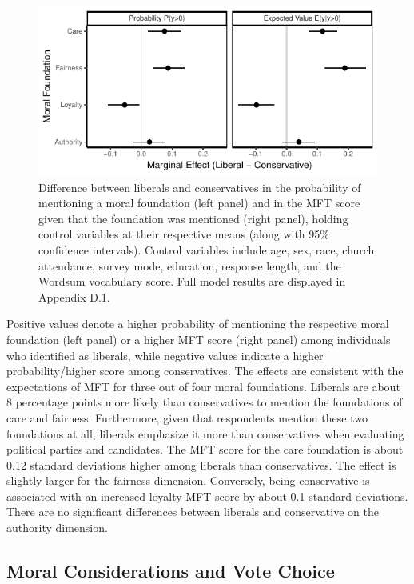 \documentclass[12pt]{article}
\begin{document}
\begin{figure}[ht]\centering
\includegraphics{../calc/fig/tobit_ideol.pdf}
\caption{Difference between liberals and conservatives in the probability of mentioning a moral foundation (left panel) and in the MFT score given that the foundation was mentioned (right panel), holding control variables at their respective means (along with 95\% confidence intervals). Control variables include age, sex, race, church attendance, survey mode, education, response length, and the Wordsum vocabulary score. Full model results are displayed in Appendix D.1.
}\label{fig:tobit_ideol}
\end{figure}

Positive values denote a higher probability of mentioning the respective moral foundation (left panel) or a higher MFT score (right panel) among individuals who identified as liberals, while negative values indicate a higher probability/higher score among conservatives. The effects are consistent with the expectations of MFT for three out of four moral foundations. Liberals are about 8 percentage points more likely than conservatives to mention the foundations of care and fairness. Furthermore, given that respondents mention these two foundations at all, liberals emphasize it more than conservatives when evaluating political parties and candidates. The MFT score for the care foundation is about 0.12 standard deviations higher among liberals than conservatives. The effect is slightly larger for the fairness dimension. Conversely, being conservative is associated with an increased loyalty MFT score by about 0.1 standard deviations. There are no significant differences between liberals and conservative on the authority dimension.


\subsection*{Moral Considerations and Vote Choice}
\end{document}
